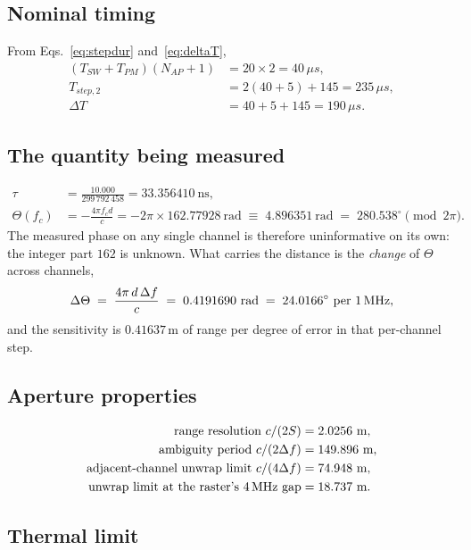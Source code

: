 \documentclass[11pt,a4paper]{article}
\newcommand{\us}{\,\ensuremath{\upmu}s}
\newcommand{\Tsw}{T_{SW}}
\newcommand{\Tpm}{T_{PM}}
\newcommand{\Nap}{N_{AP}}
\providecommand{\upmu}{\mu}
\begin{document}
\subsection{Nominal timing}

From Eqs.~\eqref{eq:stepdur} and~\eqref{eq:deltaT},
\begin{align}
(\Tsw+\Tpm)(\Nap+1) &= 20 \times 2 = 40\us, \\
T_{step,2} &= 2(40+5) + 145 = 235\us, \\
\Delta T &= 40 + 5 + 145 = 190\us .
\end{align}

\subsection{The quantity being measured}

\begin{align}
\tau &= \frac{10.000}{299\,792\,458} = 33.356410\ \text{ns}, \\
\Theta(f_c) &= -\frac{4\pi f_c d}{c} = -2\pi \times 162.77928\ \text{rad}
   \;\equiv\; 4.896351\ \text{rad} \;=\; 280.538^{\circ} \pmod{2\pi}.
\end{align}
The measured phase on any single channel is therefore uninformative on its own: the integer part
$162$ is unknown. What carries the distance is the \emph{change} of $\Theta$ across channels,
\begin{equation}
\Delta\Theta \;=\; \frac{4\pi\,d\,\Delta f}{c} \;=\; 0.4191690\ \text{rad}
   \;=\; 24.0166^{\circ}\ \text{per 1\,MHz},
\end{equation}
and the sensitivity is $0.41637$\,m of range per degree of error in that per-channel step.

\subsection{Aperture properties}

\begin{align}
\text{range resolution } c/(2S) &= 2.0256\ \text{m}, \\
\text{ambiguity period } c/(2\Delta f) &= 149.896\ \text{m}, \\
\text{adjacent-channel unwrap limit } c/(4\Delta f) &= 74.948\ \text{m}, \\
\text{unwrap limit at the raster's 4\,MHz gap} &= 18.737\ \text{m}.
\end{align}

\subsection{Thermal limit}
\end{document}

